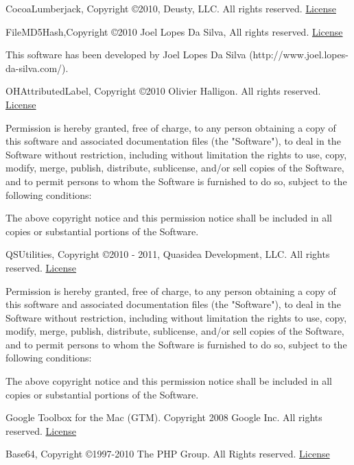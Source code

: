 \documentclass[oneside, openany, 12pt]{tufte-book}
\newcommand{\licensetext}{\scriptsize \setlength{\parskip}{0mm} \singlespacing}
\begin{document}
CocoaLumberjack, Copyright \copyright 2010, Deusty, LLC. All rights reserved. \href{https://github.com/robbiehanson/CocoaLumberjack/blob/master/LICENSE.txt}{License}

FileMD5Hash,Copyright \copyright 2010 Joel Lopes Da Silva, All rights reserved. \href{https://github.com/JoeKun/FileMD5Hash/blob/master/LICENSE}{License}

{\licensetext This software has been developed by Joel Lopes Da Silva (http://www.joel.lopes-da-silva.com/).
}


OHAttributedLabel, Copyright \copyright 2010 Olivier Halligon. All rights reserved. \href{https://github.com/AliSoftware/OHAttributedLabel/blob/master/LICENSE}{License}

{\licensetext
Permission is hereby granted, free of charge, to any person obtaining a copy
of this software and associated documentation files (the "Software"), to deal
in the Software without restriction, including without limitation the rights
to use, copy, modify, merge, publish, distribute, sublicense, and/or sell
copies of the Software, and to permit persons to whom the Software is
furnished to do so, subject to the following conditions:

The above copyright notice and this permission notice shall be included in
all copies or substantial portions of the Software.}

QSUtilities, Copyright \copyright 2010 - 2011, Quasidea Development, LLC. All rights reserved. \href{https://github.com/mikeho/QSUtilities/blob/master/LICENSE.txt}{License}

{\licensetext Permission is hereby granted, free of charge, to any person obtaining a copy
of this software and associated documentation files (the "Software"), to deal
in the Software without restriction, including without limitation the rights
to use, copy, modify, merge, publish, distribute, sublicense, and/or sell
copies of the Software, and to permit persons to whom the Software is
furnished to do so, subject to the following conditions:

The above copyright notice and this permission notice shall be included in
all copies or substantial portions of the Software.}

Google Toolbox for the Mac (GTM). Copyright 2008 Google Inc. All rights reserved. \href{http://www.apache.org/licenses/LICENSE-2.0}{License}

Base64, Copyright \copyright 1997-2010 The PHP Group. All Rights reserved. \href{http://www.php.net/license/3_01.txt}{License}
\end{document}
